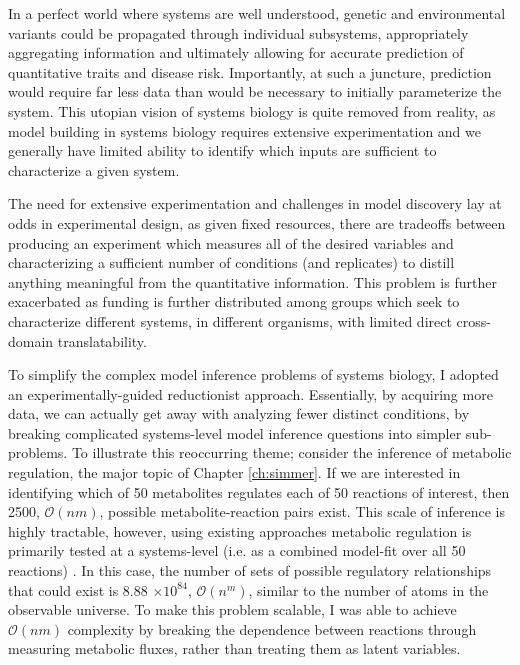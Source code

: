 In a perfect world where systems are well understood, genetic and environmental variants could be propagated through individual subsystems, appropriately aggregating information and ultimately allowing for accurate prediction of quantitative traits and disease risk.  Importantly, at such a juncture, prediction would require far less data than would be necessary to initially parameterize the system. This utopian vision of systems biology is quite removed from reality, as model building in systems biology requires extensive experimentation and we generally have limited ability to identify which inputs are sufficient to characterize a given system.

The need for extensive experimentation and challenges in model discovery lay at odds in experimental design, as given fixed resources, there are tradeoffs between producing an experiment which measures all of the desired variables and characterizing a sufficient number of conditions (and replicates) to distill anything meaningful from the quantitative information. This problem is further exacerbated as funding is further distributed among groups which seek to characterize different systems, in different organisms, with limited direct cross-domain translatability. 

To simplify the complex model inference problems of systems biology, I adopted an experimentally-guided reductionist approach. Essentially, by acquiring more data, we can actually get away with analyzing fewer distinct conditions, by breaking complicated systems-level model inference questions into simpler sub-problems. To illustrate this reoccurring theme; consider the inference of metabolic regulation, the major topic of Chapter \ref{ch:simmer}. If we are interested in identifying which of 50 metabolites regulates each of 50 reactions of interest, then 2500, $\mathcal{O}(nm)$, possible metabolite-reaction pairs exist. This scale of inference is highly tractable, however, using existing approaches metabolic regulation is primarily tested at a systems-level (i.e. as a combined model-fit over all 50 reactions) \cite{Link:2013dj, Zampar:2013fr}.  In this case, the number of sets of possible regulatory relationships that could exist is 8.88 $\times 10^{84}$, $\mathcal{O}(n^{m})$, similar to the number of atoms in the observable universe. To make this problem scalable, I was able to achieve $\mathcal{O}(nm)$ complexity by breaking the dependence between reactions through measuring metabolic fluxes, rather than treating them as latent variables.

